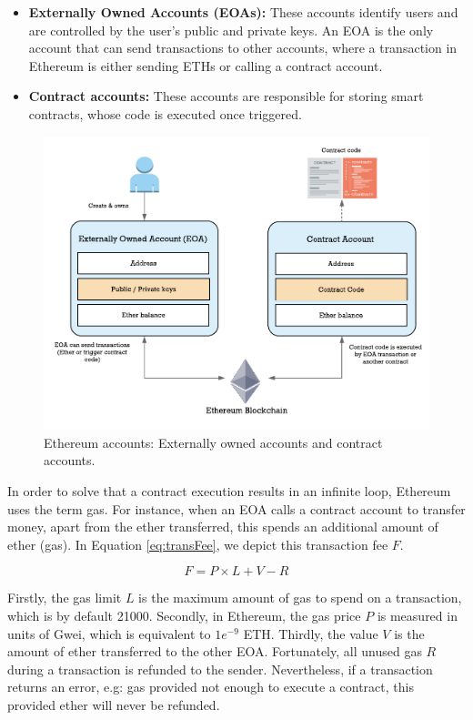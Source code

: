 \begin{itemize}
	
	\item \textbf{Externally Owned Accounts (EOAs):} These accounts identify users and are controlled by the user's public and private keys. An EOA is the only account that can send transactions to other accounts, where a transaction in Ethereum is either sending ETHs or calling a contract account.
    \item \textbf{Contract accounts:} These accounts are responsible for storing smart contracts, whose code is executed once triggered.
\end{itemize}

\begin{figure}[bth]
  \centering
  \includegraphics[width=0.6\linewidth]{gfx/ethereumAccounts}    
  \caption{Ethereum accounts: Externally owned accounts and contract 			accounts.}
  \label{fig:EthereumAccounts}
\end{figure}

In order to solve that a contract execution results in an infinite loop, Ethereum uses the term gas. For instance, when an EOA calls a contract account to transfer money, apart from the ether transferred, this spends an additional amount of ether (gas). In Equation \ref{eq:transFee}, we depict this transaction fee $F$.

\begin{equation} \label{eq:transFee}
	F = P \times L + V - R
\end{equation}

Firstly, the gas limit $L$ is the maximum amount of gas to spend on a transaction, which is by default 21000. Secondly, in Ethereum, the gas price $P$ is measured in units of Gwei, which is equivalent to $1e^{-9}$ ETH. Thirdly, the value $V$ is the amount of ether transferred to the other EOA. Fortunately, all unused gas $R$ during a transaction is refunded to the sender. Nevertheless, if a transaction returns an error, e.g: gas provided not enough to execute a contract, this provided ether will never be refunded. 

